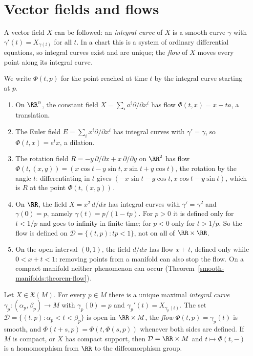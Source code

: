 \section{Vector fields and flows}\label{smooth-manifolds:section-flows}

A vector field $X$ can be followed: an \emph{integral curve} of $X$ is a smooth curve $\gamma$ with $\gamma'(t) = X_{\gamma(t)}$ for all $t$. In a chart this is
a system of ordinary differential equations, so integral curves exist and are unique; the \emph{flow} of $X$ moves every point along its integral curve.

\begin{example}\label{smooth-manifolds:example-flows}
We write $\Phi(t, p)$ for the point reached at time $t$ by the integral curve starting at $p$.
\begin{enumerate}
\item On $\RR^n$, the constant field $X = \sum_ia^i\partial/\partial x^i$ has flow $\Phi(t, x) = x + ta$, a translation.
\item The Euler field $E = \sum_ix^i\partial/\partial x^i$ has integral curves with $\gamma' = \gamma$, so $\Phi(t, x) = e^tx$, a dilation.
\item The rotation field $R = -y\,\partial/\partial x + x\,\partial/\partial y$ on $\RR^2$ has flow
$\Phi(t, (x, y)) = (x\cos t - y\sin t, x\sin t + y\cos t)$, the rotation by the angle $t$: differentiating in $t$ gives
$(-x\sin t - y\cos t, x\cos t - y\sin t)$, which is $R$ at the point $\Phi(t, (x, y))$.
\item On $\RR$, the field $X = x^2\,d/dx$ has integral curves with $\gamma' = \gamma^2$ and $\gamma(0) = p$, namely $\gamma(t) = p/(1 - tp)$. For $p > 0$ it is
defined only for $t < 1/p$ and goes to infinity in finite time; for $p < 0$ only for $t > 1/p$. So the flow is defined on
$\mathcal{D} = \{(t, p) : tp < 1\}$, not on all of $\RR \times \RR$.
\item On the open interval $(0, 1)$, the field $d/dx$ has flow $x + t$, defined only while $0 < x + t < 1$: removing points from a manifold can also stop the
flow. On a compact manifold neither phenomenon can occur (Theorem~\ref{smooth-manifolds:theorem-flow}).
\end{enumerate}
\end{example}

\begin{theorem}\label{smooth-manifolds:theorem-flow}
Let $X \in \mathfrak{X}(M)$. For every $p \in M$ there is a unique maximal \emph{integral curve} $\gamma_p \colon (\alpha_p, \beta_p) \to M$ with $\gamma_p(0) = p$ and $\gamma_p'(t) = X_{\gamma_p(t)}$. The set
$\mathcal{D} = \{(t, p) : \alpha_p < t < \beta_p\}$ is open in $\RR \times M$, the \emph{flow} $\Phi(t, p) = \gamma_p(t)$ is smooth, and $\Phi(t + s, p) = \Phi(t, \Phi(s, p))$ whenever both sides are defined. If
$M$ is compact, or $X$ has compact support, then $\mathcal{D} = \RR \times M$ and $t \mapsto \Phi(t, -)$ is a homomorphism from $\RR$ to the diffeomorphism group.
\end{theorem}


